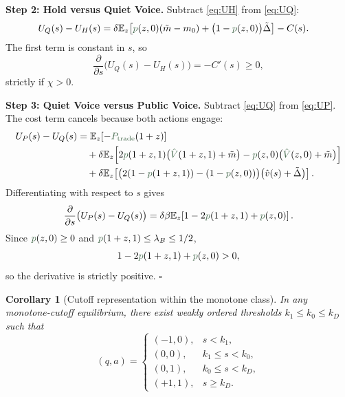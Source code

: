 \documentclass[11pt,a4paper]{article}
\theoremstyle{definition}
\theoremstyle{plain}
\newtheorem{corollary}{Corollary}[section]
\theoremstyle{remark}
\newcommand{\E}{\mathbb{E}}
\newcommand{\1}{\mathbf{1}}
\newcommand{\outcome}[1]{{\color{ForestGreen!50!black}#1}}
\begin{document}
\textbf{Step 2: Hold versus Quiet Voice.}
Subtract \eqref{eq:UH} from \eqref{eq:UQ}:
\begin{align}
U_Q(s)-U_H(s)
&=
\delta \E_z\!\left[
\outcome{p}(z,0)(\tilde m-m_0)
+
\big(1-\outcome{p}(z,0)\big)\tilde{\Delta}
\right]
- C(s).
\label{eq:diff-HQ}
\end{align}
The first term is constant in $s$, so
\begin{equation}
\frac{\partial}{\partial s}\big(U_Q(s)-U_H(s)\big)
= -C'(s) \ge 0,
\label{eq:diff-HQ-deriv}
\end{equation}
strictly if $\chi>0$.

\textbf{Step 3: Quiet Voice versus Public Voice.}
Subtract \eqref{eq:UQ} from \eqref{eq:UP}. The cost term cancels because both actions engage:
\begin{align}
U_P(s)-U_Q(s)
&=
\E_z\!\left[-\outcome{P_{\textup{trade}}}(1+z)\right]
\nonumber\\
&\quad
+
\delta \E_z\!\left[
2\outcome{p}(1+z,1)\big(\outcome{\hat V}(1+z,1)+\tilde m\big)
-
\outcome{p}(z,0)\big(\outcome{\hat V}(z,0)+\tilde m\big)
\right]
\nonumber\\
&\quad
+
\delta \E_z\!\left[
\big(2(1-\outcome{p}(1+z,1))-(1-\outcome{p}(z,0))\big)
\big(\hat v(s)+\tilde{\Delta}\big)
\right].
\label{eq:diff-QP}
\end{align}
Differentiating with respect to $s$ gives
\begin{equation}
\frac{\partial}{\partial s}\big(U_P(s)-U_Q(s)\big)
=
\delta \beta \E_z\!\left[
1 - 2\outcome{p}(1+z,1) + \outcome{p}(z,0)
\right].
\label{eq:diff-QP-deriv}
\end{equation}
Since $\outcome{p}(z,0)\ge 0$ and $\outcome{p}(1+z,1)\le \lambda_B \le 1/2$,
\begin{equation}
1 - 2\outcome{p}(1+z,1) + \outcome{p}(z,0) > 0,
\label{eq:qp-positive}
\end{equation}
so the derivative is strictly positive.
\hfill$\square$

\begin{corollary}[Cutoff representation within the monotone class]
\label{cor:cutoffs}
In any monotone-cutoff equilibrium, there exist weakly ordered thresholds $k_1\le k_0\le k_D$ such that
\begin{equation}
(q,a)=
\begin{cases}
(-1,0), & s<k_1, \\
(0,0), & k_1\le s<k_0, \\
(0,1), & k_0\le s<k_D, \\
(+1,1), & s\ge k_D.
\end{cases}
\label{eq:cutoff-rule}
\end{equation}
\end{corollary}
\end{document}
